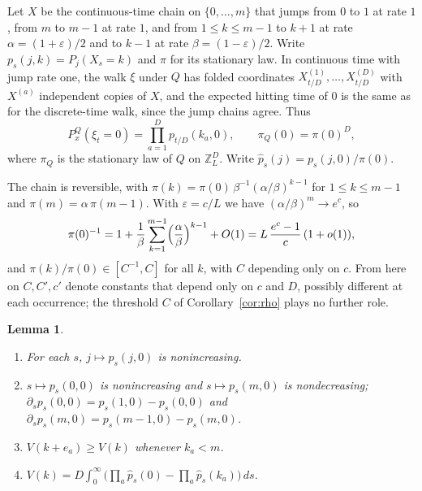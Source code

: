 \documentclass[11pt]{amsart}
\newtheorem{lemma}[theorem]{Lemma}
\theoremstyle{remark}
\newcommand{\eps}{\varepsilon}
\newcommand{\Z}{\mathbb{Z}}
\begin{document}
Let $X$ be the continuous-time chain on $\{0,\dots,m\}$ that jumps from $0$ to $1$ at rate $1$, from $m$ to $m-1$ at
rate $1$, and from $1\le k\le m-1$ to $k+1$ at rate $\alpha=(1+\eps)/2$ and to $k-1$ at rate $\beta=(1-\eps)/2$. Write
$p_s(j,k)=P_j(X_s=k)$ and $\pi$ for its stationary law. In continuous time with jump rate one, the walk $\xi$ under $Q$ has
folded coordinates $X^{(1)}_{t/D},\dots,X^{(D)}_{t/D}$ with $X^{(a)}$ independent copies of $X$, and the expected
hitting time of $0$ is the same as for the discrete-time walk, since the jump chains agree. Thus
\begin{equation}\label{eq:product}
P^Q_x(\xi_t=0)=\prod_{a=1}^Dp_{t/D}(k_a,0),\qquad \pi_Q(0)=\pi(0)^D,
\end{equation}
where $\pi_Q$ is the stationary law of $Q$ on $\Z_L^D$. Write $\hat p_s(j)=p_s(j,0)/\pi(0)$.

The chain is reversible, with $\pi(k)=\pi(0)\,\beta^{-1}(\alpha/\beta)^{k-1}$ for $1\le k\le m-1$ and $\pi(m)=\alpha\,\pi(m-1)$. With
$\eps=c/L$ we have $(\alpha/\beta)^m\to e^{c}$, so
\begin{equation}\label{eq:pi0}
\pi(0)^{-1}=1+\frac1\beta\sum_{k=1}^{m-1}\Bigl(\frac\alpha\beta\Bigr)^{k-1}+O(1)=L\,\frac{e^c-1}{c}\,(1+o(1)),
\end{equation}
and $\pi(k)/\pi(0)\in[C^{-1},C]$ for all $k$, with $C$ depending only on $c$. From here on $C,C',c'$ denote
constants that depend only on $c$ and $D$, possibly different at each occurrence; the threshold $C$ of
Corollary~\ref{cor:rho} plays no further role.

\begin{lemma}\label{lem:folded}
\begin{enumerate}
\item[(i)] For each $s$, $j\mapsto p_s(j,0)$ is nonincreasing.
\item[(ii)] $s\mapsto p_s(0,0)$ is nonincreasing and $s\mapsto p_s(m,0)$ is nondecreasing; $\partial_sp_s(0,0)=p_s(1,0)-p_s(0,0)$ and $\partial_sp_s(m,0)=p_s(m-1,0)-p_s(m,0)$.
\item[(iii)] $V(k+e_a)\ge V(k)$ whenever $k_a<m$.
\item[(iv)] $V(k)=D\int_0^\infty\bigl(\prod_a\hat p_s(0)-\prod_a\hat p_s(k_a)\bigr)\,ds$.
\end{enumerate}
\end{lemma}
\end{document}
